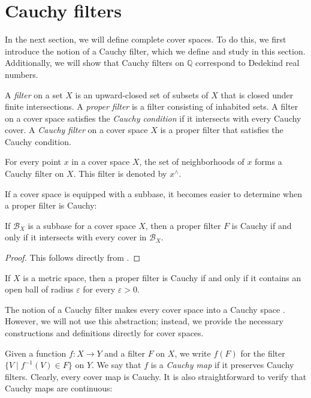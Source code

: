 \documentclass[pdflatex,sn-mathphys-num]{sn-jnl}
\theoremstyle{definition}
\theoremstyle{remark}
\numberwithin{figure}{section}
\begin{document}
\section{Cauchy filters}
\label{sec:filters}

In the next section, we will define complete cover spaces.
To do this, we first introduce the notion of a Cauchy filter, which we define and study in this section.
Additionally, we will show that Cauchy filters on $\mathbb{Q}$ correspond to Dedekind real numbers.

\begin{defn}
A \emph{filter} on a set $X$ is an upward-closed set of subsets of $X$ that is closed under finite intersections.
A \emph{proper filter} is a filter consisting of inhabited sets.
A filter on a cover space satisfies the \emph{Cauchy condition} if it intersects with every Cauchy cover.
A \emph{Cauchy filter} on a cover space $X$ is a proper filter that satisfies the Cauchy condition.
\end{defn}

\begin{example}
For every point $x$ in a cover space $X$, the set of neighborhoods of $x$ forms a Cauchy filter on $X$.
This filter is denoted by $x^\wedge$.
\end{example}

If a cover space is equipped with a subbase, it becomes easier to determine when a proper filter is Cauchy:

\begin{prop}
If $\mathcal{B}_X$ is a subbase for a cover space $X$, then a proper filter $F$ is Cauchy if and only if it intersects with every cover in $\mathcal{B}_X$.
\end{prop}
\begin{proof}
This follows directly from .
\end{proof}

\begin{cor}
If $X$ is a metric space, then a proper filter is Cauchy if and only if it contains an open ball of radius $\varepsilon$ for every $\varepsilon > 0$.
\end{cor}

The notion of a Cauchy filter makes every cover space into a Cauchy space \cite[Definition~1.3.1]{cauchy-spaces}.
However, we will not use this abstraction; instead, we provide the necessary constructions and definitions directly for cover spaces.

Given a function $f : X \to Y$ and a filter $F$ on $X$, we write $f(F)$ for the filter $\{ V \mid f^{-1}(V) \in F \}$ on $Y$.
We say that $f$ is a \emph{Cauchy map} if it preserves Cauchy filters.
Clearly, every cover map is Cauchy.
It is also straightforward to verify that Cauchy maps are continuous:
\end{document}
